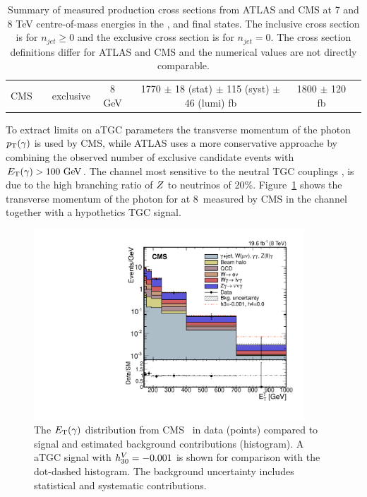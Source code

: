 \begin{table}[htp]
\begin{center}
{\begin{tabular}{|c|c|c|c|c|c|c|}
CMS  	   & \Zgllg  & exclusive      & 8 GeV &     1770 $\pm$ 18 (stat) $\pm$ 115 (syst) $\pm$ 46 (lumi) fb     &  1800 $\pm$ 120 fb          & \cite{Khachatryan:2015kea} \\ 
\end{tabular}
}
\caption{Summary of measured \Vg production cross sections from ATLAS and CMS
at 7 and 8 TeV centre-of-mass energies in the \Wglvg, \Zgvvg\; and \Zgllg\; final states. The inclusive cross section is for $n_{jet} \geq 0$ and the exclusive cross section is for $n_{jet}=0$. The
cross section definitions differ for ATLAS and CMS and the numerical values are not directly 
comparable.}
\end{center}
\label{tab:sss-Vgamma-prod-xsec}
\end{table}

To extract limits on aTGC parameters the transverse momentum of the photon $p_{\mathrm{T}}(\gamma)$ is used 
by CMS, while ATLAS uses a more conservative approache by combining the observed 
number of exclusive \Vg candidate events with $\ET(\gamma)>100\GeV$.  
The channel most sensitive to the neutral TGC couplings \hthreev, \hfourv is \Zgvvg
due to the high branching ratio of $Z$ to neutrinos of 20\%. 
Figure~\ref{fig:sss-inclboson-diboson-Vgamma-zgamvvgamptgam} shows the transverse momentum of the photon for 
at 8~\TeV measured by CMS in the \Zgvvg\; channel~\cite{Khachatryan:2016yro} together with a hypothetics
TGC signal.

% 
\begin{figure}[htbp]
  \begin{center}
  \includegraphics[width=0.9\textwidth]{figures/sss-inclboson-diboson-Vgamma-zgamvvgamptgam.pdf}
  \caption{ 
  The $E_{\mathrm{T}}(\gamma)$ distribution from CMS~\cite{Khachatryan:2016yro} in data (points) compared to signal and estimated background contributions (histogram). A aTGC signal with $h_{30}^V=-0.001$ is 
  shown for comparison with the dot-dashed histogram. The background uncertainty includes statistical and systematic contributions. 
}
\label{fig:sss-inclboson-diboson-Vgamma-zgamvvgamptgam}
\end{center}
\end{figure}

